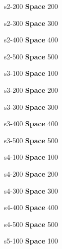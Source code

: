 \documentclass{beamer}
\def \firstcat {\textbf{Space}}
\begin{document}
\content                       
{s2-200}                     
{\firstcat}                          
{200}{             
}


\content           
{s2-300}                     
{\firstcat}                          
{300}{                       
}


\content                       
{s2-400}                     
{\firstcat}                          
{400}{       
}


\content                       
{s2-500}                     
{\firstcat}                          
{500}{    
}


\content                       
{s3-100}                     
{\firstcat}                          
{100}{    
}


\content                       
{s3-200}                     
{\firstcat}                          
{200}{             
}


\content           
{s3-300}                     
{\firstcat}                          
{300}{                       
}


\content                       
{s3-400}                     
{\firstcat}                          
{400}{       
}


\content                       
{s3-500}                     
{\firstcat}                          
{500}{    
}


\content                       
{s4-100}                     
{\firstcat}                          
{100}{    
}


\content                       
{s4-200}                     
{\firstcat}                          
{200}{             
}


\content           
{s4-300}                     
{\firstcat}                          
{300}{                       
}


\content                       
{s4-400}                     
{\firstcat}                          
{400}{       
}


\content                       
{s4-500}                     
{\firstcat}                          
{500}{    
}


\content                       
{s5-100}                     
{\firstcat}                          
{100}{    
}
\end{document}
